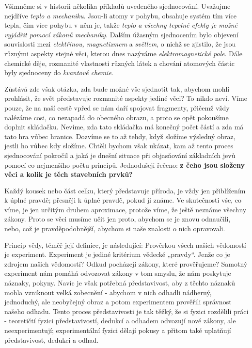     Všimněme si v historii několika příkladů uvedeného sjednocování. Uvažujme nejdříve \emph{teplo a
    mechaniku}. Jsou-li atomy v pohybu, obsahuje systém tím více tepla, čím více pohybu v něm je,
    takže \emph{teplo a všechny tepelné efekty je možné vyjádřit pomocí zákonů mechaniky}. Dalším
    úžasným sjednocením bylo objevení souvislosti mezi \emph{elektřinou, magnetizmem} a
    \emph{světlem}, o nichž se zjistilo, že jsou různými aspekty stejné věci, kterou dnes nazýváme
    \emph{elektromagnetické pole}. Dále chemické děje, rozmanité vlastnosti různých látek a chování
    atomových částic byly sjednoceny do \emph{kvantové chemie}.
    
    Zůstává zde však otázka, zda bude možné vše sjednotit tak, abychom mohli prohlásit, že svět 
    představuje rozmanité aspekty jediné věci? To nikdo neví. Víme pouze, že na naší cestě vpřed se 
    nám daří spojovat fragmenty, přičemž vždy nalézáme cosi, co nezapadá do obecného obrazu, a 
    proto se opět pokoušíme doplnit skládačku. Nevíme, zda tato skládačka má konečný počet částí a 
    zda má tato hra vůbec hranice. Dozvíme se to až tehdy, když složíme výsledný obraz, jestli ho 
    vůbec kdy složíme. Chtěli bychom však ukázat, kam až tento proces sjednocování pokročil a jaká 
    je dnešní situace při objasňování základních jevů pomocí co nejmenšího počtu principů. 
    Jednodušeji řečeno: \textbf{z čeho jsou složeny věci a kolik je těch stavebních prvků?} 
    \cite[s.~27]{Feynman02}    


    Každý kousek nebo část celku, který představuje příroda, je vždy jen přiblížením k úplné pravdě;
    přesněji k úplné pravdě, pokud ji známe. Ve skutečnosti vše, co víme, je jen určitým druhem
    aproximace, protože víme, že ještě neznáme všechny zákony. Proto se věci musíme učit jen proto,
    abychom se je znovu odnaučili, nebo, což je pravděpodobnější, abychom si naše znalosti o nich
    opravovali.
    
    Princip vědy, téměř její definice, je následující: Prověrkou všech našich vědomostí je 
    experiment. Experiment je jediné kritérium vědecké „pravdy“. Jenže co je zdrojem našich 
    vědomostí? Odkud pocházejí zákony, které prověřujeme? Samotný experiment nám pomáhá odvozovat 
    zákony v tom smyslu, že nám poskytuje náznaky, pokyny. Navíc je však potřebná představivost, 
    aby z těchto náznaků mohla vzniknout velká zobecnění - abychom v nich odhadli nádherný, 
    jednoduchý, ale neobyčejný obraz a potom experimentem prověřili správnost našeho odhadu. Tento
    proces představivosti je tak těžký, že si fyzici rozdělili práci - teoretičtí fyzici 
    představivostí, dedukcí a odhadem odvozují nové zákony, ale neexperimentují; experimentální 
    fyzici dělají pokusy a přitom také uplatňují představivost, dedukci a odhad.
    
